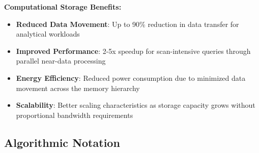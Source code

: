 \documentclass[12pt,a4paper]{article}
\begin{document}
    \textbf{Computational Storage Benefits:}
    \begin{itemize}
        \item \textbf{Reduced Data Movement}: Up to 90\% reduction in data transfer for analytical workloads
        \item \textbf{Improved Performance}: 2-5x speedup for scan-intensive queries through parallel near-data processing
        \item \textbf{Energy Efficiency}: Reduced power consumption due to minimized data movement across the memory hierarchy
        \item \textbf{Scalability}: Better scaling characteristics as storage capacity grows without proportional bandwidth requirements
    \end{itemize}

    \subsection{Algorithmic Notation}
\end{document}
